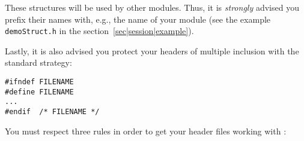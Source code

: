 These structures  will  be  used by other   modules.   Thus, it  is  {\em
strongly} advised you prefix  their  names with,  e.g., the name  of your
module (see        the  example      {\tt    demoStruct.h}   in       the
section~\ref{sec|session|example}).

Lastly, it is also advised you protect your headers of multiple inclusion
with the standard strategy:

\begin{center}\begin{cartouche}\small\begin{verbatim}
#ifndef FILENAME
#define FILENAME
...
#endif  /* FILENAME */
\end{verbatim}\end{cartouche}\end{center}

You must respect three rules in order to get your header files working
with \GenoM:


